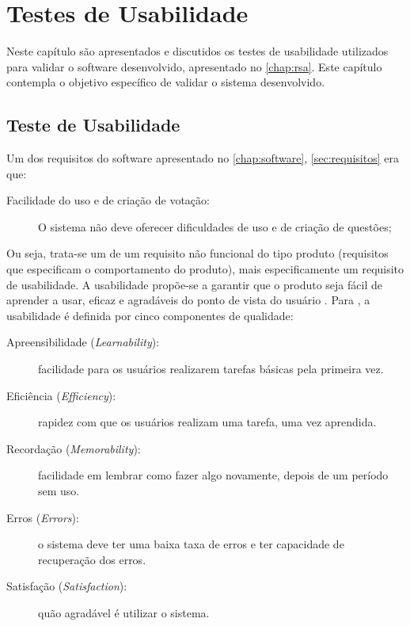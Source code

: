 \chapter{Testes de Usabilidade}\label{chap:experimentos}

Neste capítulo são apresentados e discutidos os testes de usabilidade
utilizados para validar o software desenvolvido, apresentado no \autoref{chap:rsa}.
Este capítulo contempla o objetivo específico de validar o sistema desenvolvido.

\section{Teste de Usabilidade}

Um dos requisitos do software apresentado no \autoref{chap:software}, \autoref{sec:requisitos} era que:
\begin{description}
\item[Facilidade do uso e de criação de votação:] O sistema não deve oferecer
dificuldades de uso e de criação de questões;
\end{description}

Ou seja, trata-se um de um requisito não funcional do tipo produto (requisitos que
especificam o comportamento do produto), mais especificamente um requisito de usabilidade.
A usabilidade propõe-se a garantir que o produto seja fácil de aprender a usar, eficaz e
agradáveis do ponto de vista do usuário \cite{rogers2013design}.
Para , a usabilidade é definida por cinco componentes de qualidade:

\begin{description}
  \item[Apreensibilidade (\textit{Learnability}):] facilidade para os usuários realizarem tarefas básicas
  pela primeira vez.
  \item[Eficiência (\textit{Efficiency}):] rapidez com que os usuários realizam uma tarefa, uma vez aprendida.
  \item[Recordação (\textit{Memorability}):] facilidade em lembrar como fazer algo novamente, depois de um período sem uso.
  \item[Erros (\textit{Errors}):] o sistema deve ter uma baixa taxa de erros e ter capacidade de
  recuperação dos erros.
  \item[Satisfação (\textit{Satisfaction}):] quão agradável é utilizar o sistema.
\end{description}

